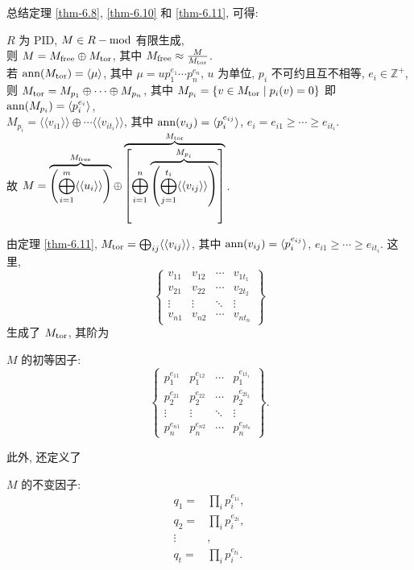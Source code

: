 \documentclass{note}
\begin{document}
总结定理 \ref{thm-6.8}, \ref{thm-6.10} 和 \ref{thm-6.11}, 可得:
\begin{thm}[(课本定理 6.12)]
    $R$ 为 PID, $M\in R-\operatorname{mod}$ 有限生成,\\
    则 $M=M_{\operatorname{free}}\oplus M_{\operatorname{tor}}$, 其中 $M_{\operatorname{free}}\approx\frac{M}{M_{\operatorname{tor}}}$.\\
    若 $\operatorname{ann}(M_{\operatorname{tor}})=\langle\mu\rangle$, 其中 $\mu=up_1^{e_1}\cdots p_n^{e_n}$, $u$ 为单位, $p_i$ 不可约且互不相等, $e_i\in\mathbb{Z}^+$,\\
    则 $M_{\operatorname{tor}}=M_{p_1}\oplus\cdots\oplus M_{p_n}$, 其中 $M_{p_i}=\{v\in M_{\operatorname{tor}}\mid p_i(v)=0\}$ 即 $\operatorname{ann}(M_{p_i})=\langle p_i^{e_i}\rangle$,\\
    $M_{p_i}=\langle\langle v_{i1}\rangle\rangle\oplus\cdots\langle\langle v_{it_i}\rangle\rangle$, 其中 $\operatorname{ann}(v_{ij})=\langle p_i^{e_{ij}}\rangle$, $e_i=e_{i1}\geq\cdots\geq e_{it_i}$.\\
    故 $M=\overbrace{\left(\bigoplus_{i=1}^m\langle\langle u_i\rangle\rangle\right)}^{M_{\operatorname{free}}}\oplus\overbrace{\left[\bigoplus_{i=1}^n\overbrace{\left(\bigoplus_{j=1}^{t_i}\langle\langle v_{ij}\rangle\rangle\right)}^{M_{p_i}}\right]}^{M_{\operatorname{tor}}}$.
\end{thm}

由定理 \ref{thm-6.11}, $M_{\operatorname{tor}}=\bigoplus_{ij}\langle\langle v_{ij}\rangle\rangle$, 其中 $\operatorname{ann}(v_{ij})=\langle p_i^{e_{ij}}\rangle$, $e_{i1}\geq\cdots\geq e_{it_i}$. 这里,
\[
    \begin{Bmatrix}
        v_{11}&v_{12}&\cdots&v_{1t_1}\\
        v_{21}&v_{22}&\cdots&v_{2t_2}\\
        \vdots&\vdots&\ddots&\vdots\\
        v_{n1}&v_{n2}&\cdots&v_{nt_n}
    \end{Bmatrix}
\]
生成了 $M_{\operatorname{tor}}$, 其阶为
\begin{df}[初等因子]
    $M$ 的初等因子:
    \[
        \begin{Bmatrix}
            p_1^{e_{11}}&p_1^{e_{12}}&\cdots&p_1^{e_{1t_1}}\\
            p_2^{e_{21}}&p_2^{e_{22}}&\cdots&p_2^{e_{2t_2}}\\
            \vdots&\vdots&\ddots&\vdots\\
            p_n^{e_{n1}}&p_n^{e_{n2}}&\cdots&p_n^{e_{nt_n}}
        \end{Bmatrix}.
    \]
\end{df}
此外, 还定义了
\begin{df}[不变因子]
    $M$ 的不变因子:
    \begin{align*}
        q_1=&\prod_ip_i^{e_{1i}},\\
        q_2=&\prod_ip_i^{e_{2i}},\\
        \vdots&,\\
        q_t=&\prod_ip_i^{e_{ti}}.
    \end{align*}
\end{df}
\ifx\allfiles\undefined
\end{document}
